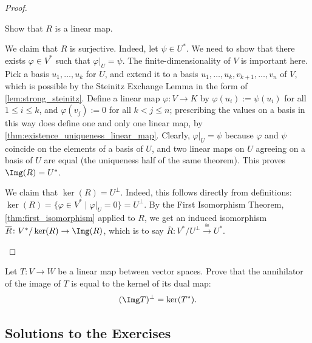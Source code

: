 \begin{proof}
\begin{enumerate}
    \begin{exercise}
      \label{exc:restriction_linear}
      Show that $R$ is a linear map.
\end{exercise}

    We claim that $R$ is surjective. Indeed, let $\psi \in U^*$. We need to show that there exists $\varphi \in V^*$ such that $\varphi|_U = \psi$. The finite-dimensionality of $V$ is important here. Pick a basis $u_1, \dots, u_k$ for $U$, and extend it to a basis $u_1, \dots, u_k, v_{k+1}, \dots, v_n$ of $V$, which is possible by the Steinitz Exchange Lemma in the form of \cref{lem:strong_steinitz}. Define a linear map $\varphi \colon V \to K$ by $\varphi(u_i) := \psi(u_i)$ for all $1 \leq i \leq k$, and $\varphi(v_j) := 0$ for all $k < j \leq n$; prescribing the values on a basis in this way does define one and only one linear map, by \cref{thm:existence_uniqueness_linear_map}. Clearly, $\varphi|_U = \psi$ because $\varphi$ and $\psi$ coincide on the elements of a basis of $U$, and two linear maps on $U$ agreeing on a basis of $U$ are equal (the uniqueness half of the same theorem). This proves $\Img(R) = U^*$.

    We claim that $\ker(R) = U^\perp$. Indeed, this follows directly from definitions: $\ker(R) = \{\varphi \in V^* \mid \varphi|_U = 0\} = U^\perp$.
    By the First Isomorphism Theorem, \cref{thm:first_isomorphism} applied to $R$, we get an induced isomorphism $\overline{R} \colon V^*/\ker(R) \to \Img(R)$, which is to say $\overline{R} \colon V^*/U^\perp \xrightarrow{\cong} U^*$.
  \end{enumerate}
\end{proof}

\begin{exercise}
  \label{exc:annihilator_image_kernel_dual}
  Let $T \colon V \to W$ be a linear map between vector spaces. Prove that the annihilator of the image of $T$ is equal to the kernel of its dual map:
  \[ (\Img T)^\perp = \ker(T^*). \]
\end{exercise}

\subsection{Solutions to the Exercises}
\label{sec:solutions_quotients}

